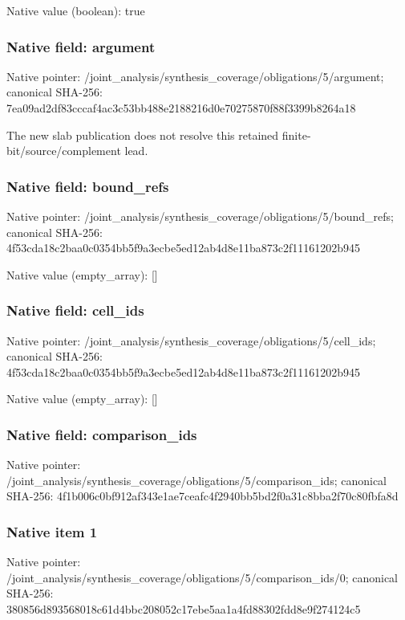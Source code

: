 \documentclass[10pt,a4paper]{article}
\begin{document}
Native value (boolean): true

\subsubsection{Native field: argument}
Native pointer: /joint\_\allowbreak{}analysis/synthesis\_\allowbreak{}coverage/obligations/5/argument; canonical SHA-256: 7ea09ad2df83cccaf4ac3c53bb488e2188216d0e70275870f88f3399b8264a18

\begingroup\raggedright\sloppy The new slab publication does not resolve this retained finite-bit/\allowbreak{}source/\allowbreak{}complement lead.\par\endgroup

\subsubsection{Native field: bound\_\allowbreak{}refs}
Native pointer: /joint\_\allowbreak{}analysis/synthesis\_\allowbreak{}coverage/obligations/5/bound\_\allowbreak{}refs; canonical SHA-256: 4f53cda18c2baa0c0354bb5f9a3ecbe5ed12ab4d8e11ba873c2f11161202b945

Native value (empty\_\allowbreak{}array): []

\subsubsection{Native field: cell\_\allowbreak{}ids}
Native pointer: /joint\_\allowbreak{}analysis/synthesis\_\allowbreak{}coverage/obligations/5/cell\_\allowbreak{}ids; canonical SHA-256: 4f53cda18c2baa0c0354bb5f9a3ecbe5ed12ab4d8e11ba873c2f11161202b945

Native value (empty\_\allowbreak{}array): []

\subsubsection{Native field: comparison\_\allowbreak{}ids}
Native pointer: /joint\_\allowbreak{}analysis/synthesis\_\allowbreak{}coverage/obligations/5/comparison\_\allowbreak{}ids; canonical SHA-256: 4f1b006c0bf912af343e1ae7ceafc4f2940bb5bd2f0a31c8bba2f70c80fbfa8d

\subsubsection{Native item 1}
Native pointer: /joint\_\allowbreak{}analysis/synthesis\_\allowbreak{}coverage/obligations/5/comparison\_\allowbreak{}ids/0; canonical SHA-256: 380856d893568018c61d4bbc208052c17ebe5aa1a4fd88302fdd8e9f274124c5
\end{document}
